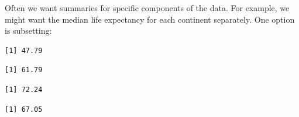 \documentclass[
]{krantz}
\makeatletter
\newenvironment{Shaded}{\begin{snugshade}}{\end{snugshade}}
\newcommand{\KeywordTok}[1]{\textcolor[rgb]{0.27,0.27,0.27}{\textbf{#1}}}
\newcommand{\NormalTok}[1]{#1}
\newcommand{\OperatorTok}[1]{\textcolor[rgb]{0.43,0.43,0.43}{\textbf{#1}}}
\newcommand{\StringTok}[1]{\textcolor[rgb]{0.5,0.5,0.5}{#1}}
\newenvironment{kframe}{%
\medskip{}
\setlength{\fboxsep}{.8em}
 \def\at@end@of@kframe{}%
 \ifinner\ifhmode%
  \def\at@end@of@kframe{\end{minipage}}%
  \begin{minipage}{\columnwidth}%
 \fi\fi%
 \def\FrameCommand##1{\hskip\@totalleftmargin \hskip-\fboxsep
 \colorbox{shadecolor}{##1}\hskip-\fboxsep
     \hskip-\linewidth \hskip-\@totalleftmargin \hskip\columnwidth}%
 \MakeFramed {\advance\hsize-\width
   \@totalleftmargin\z@ \linewidth\hsize
   \@setminipage}}%
 {\par\unskip\endMakeFramed%
 \at@end@of@kframe}
\renewenvironment{Shaded}{\begin{kframe}}{\end{kframe}}
\makeatother
\begin{document}
Often we want summaries for specific components of the data. For example, we might want the median life expectancy for each continent separately. One option is subsetting:

\begin{Shaded}
\end{Shaded}

\begin{verbatim}
[1] 47.79
\end{verbatim}

\begin{Shaded}
\end{Shaded}

\begin{verbatim}
[1] 61.79
\end{verbatim}

\begin{Shaded}
\end{Shaded}

\begin{verbatim}
[1] 72.24
\end{verbatim}

\begin{Shaded}
\end{Shaded}

\begin{verbatim}
[1] 67.05
\end{verbatim}
\end{document}
